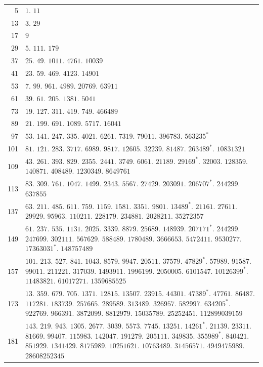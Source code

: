 \begin{longtable}{@{}r|p{\dimexpr\linewidth-38pt\relax}@{}}
5 & $1.$ $11$\\
13 & $3.$ $29$\\
17 & $9$\\
29 & $5.$ $111.$ $179$\\
37 & $25.$ $49.$ $1011.$ $4761.$ $10039$\\
41 & $23.$ $59.$ $469.$ $4123.$ $14901$\\
53 & $7.$ $99.$ $961.$ $4989.$ $20769.$ $63911$\\
61 & $39.$ $61.$ $205.$ $1381.$ $5041$\\
73 & $19.$ $127.$ $311.$ $419.$ $749.$ $466489$\\
89 & $21.$ $199.$ $691.$ $1089.$ $5717.$ $16041$\\
97 & $53.$ $141.$ $247.$ $335.$ $4021.$ $6261.$ $7319.$ $79011.$ $396783.$ $563235^{*}$\\
101 & $81.$ $121.$ $283.$ $3717.$ $6989.$ $9817.$ $12605.$ $32239.$ $81487.$ $263489^{*}.$ $10831321$\\
109 & $43.$ $261.$ $393.$ $829.$ $2355.$ $2441.$ $3749.$ $6061.$ $21189.$ $29169^{*}.$ $32003.$ $128359.$ $140871.$ $408489.$ $1230349.$ $8649761$\\
113 & $83.$ $309.$ $761.$ $1047.$ $1499.$ $2343.$ $5567.$ $27429.$ $203091.$ $206707^{*}.$ $244299.$ $637855$\\
137 & $63.$ $211.$ $485.$ $611.$ $759.$ $1159.$ $1581.$ $3351.$ $9801.$ $13489^{*}.$ $21161.$ $27611.$ $29929.$ $95963.$ $110211.$ $228179.$ $234881.$ $2028211.$ $35272357$\\
149 & $61.$ $237.$ $535.$ $1131.$ $2025.$ $3339.$ $8879.$ $25689.$ $148939.$ $207171^{*}.$ $244299.$ $247699.$ $302111.$ $567629.$ $588489.$ $1780489.$ $3666653.$ $5472411.$ $9530277.$ $17363031^{*}.$ $148757489$\\
157 & $101.$ $213.$ $527.$ $841.$ $1043.$ $8579.$ $9947.$ $20511.$ $37579.$ $47829^{*}.$ $57989.$ $91587.$ $99011.$ $211221.$ $317039.$ $1493911.$ $1996199.$ $2050005.$ $6101547.$ $10126399^{*}.$ $11483821.$ $61017271.$ $1359685525$\\
173 & $13.$ $359.$ $679.$ $705.$ $1371.$ $12815.$ $13507.$ $23915.$ $44301.$ $47389^{*}.$ $47761.$ $86487.$ $117281.$ $183739.$ $257665.$ $289589.$ $313489.$ $326957.$ $582997.$ $634205^{*}.$ $922769.$ $966391.$ $3872099.$ $8812979.$ $15035789.$ $25252451.$ $112899039159$\\
181 & $143.$ $219.$ $943.$ $1305.$ $2677.$ $3039.$ $5573.$ $7745.$ $13251.$ $14261^{*}.$ $21139.$ $23311.$ $81669.$ $99407.$ $115983.$ $142047.$ $191279.$ $205111.$ $349835.$ $355989^{*}.$ $840421.$ $851929.$ $1341429.$ $8175989.$ $10251621.$ $10763489.$ $31456571.$ $4949475989.$ $28608252345$\\

\end{longtable}
